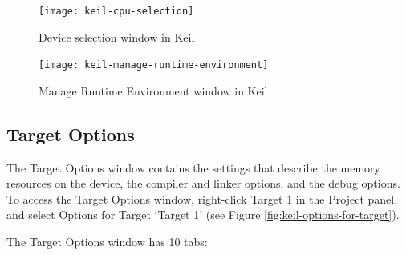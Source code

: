 \begin{figure}
\centering
\texttt{[image: keil-cpu-selection]}
\caption{Device selection window in Keil}
\label{fig:keil-cpu-selection}
\end{figure}

\begin{figure}
\centering
\texttt{[image: keil-manage-runtime-environment]}
\caption{Manage Runtime Environment window in Keil}
\label{fig:keil-manage-runtime-environment}
\end{figure}

\subsection{Target Options}
The Target Options window contains the settings that describe the memory resources on the device, the compiler and linker options, and the debug options. To access the Target Options window, right-click Target 1 in the Project panel, and select Options for Target `Target 1' (see Figure \ref{fig:keil-options-for-target}).

The Target Options window has 10 tabs:

